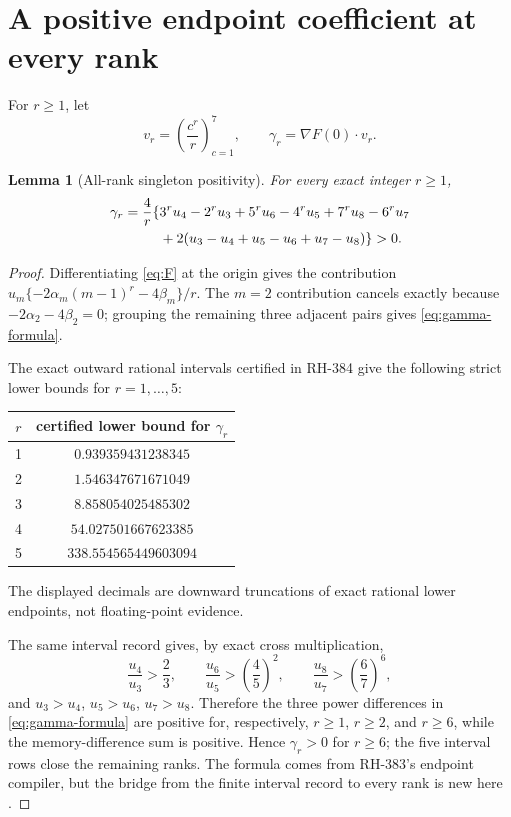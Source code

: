 \documentclass[11pt]{article}
\newtheorem{lemma}[theorem]{Lemma}
\theoremstyle{definition}
\theoremstyle{remark}
\begin{document}
\section{A positive endpoint coefficient at every rank}

For $r\ge1$, let
\begin{equation}
 v_r=\left(\frac{c^r}{r}\right)_{c=1}^7,
 \qquad \gamma_r=\nabla F(0)\mathbin{\cdot}v_r.
 \label{eq:vr-gamma}
\end{equation}

\begin{lemma}[All-rank singleton positivity]
\label{lem:gamma}
For every exact integer $r\ge1$,
\begin{align}
 \gamma_r=\frac4r\{&3^ru_4-2^ru_3+5^ru_6-4^ru_5
 +7^ru_8-6^ru_7\notag\\
 &+2(u_3-u_4+u_5-u_6+u_7-u_8)\}>0.
 \label{eq:gamma-formula}
\end{align}
\end{lemma}

\begin{proof}
Differentiating \eqref{eq:F} at the origin gives the contribution
$u_m\{-2\alpha_m(m-1)^r-4\beta_m\}/r$.  The $m=2$ contribution
cancels exactly because $-2\alpha_2-4\beta_2=0$; grouping the remaining
three adjacent pairs gives \eqref{eq:gamma-formula}.

The exact outward rational intervals certified in RH-384 give the
following strict lower bounds for $r=1,\ldots,5$:
\begin{center}
\begin{tabular}{@{}c@{\qquad}c@{}}
\toprule
$r$ & certified lower bound for $\gamma_r$\\
\midrule
1 & $0.939359431238345$\\
2 & $1.546347671671049$\\
3 & $8.858054025485302$\\
4 & $54.027501667623385$\\
5 & $338.554565449603094$\\
\bottomrule
\end{tabular}
\end{center}
The displayed decimals are downward truncations of exact rational lower
endpoints, not floating-point evidence.

The same interval record gives, by exact cross multiplication,
\begin{equation}
 \frac{u_4}{u_3}>\frac23,\qquad
 \frac{u_6}{u_5}>\left(\frac45\right)^2,\qquad
 \frac{u_8}{u_7}>\left(\frac67\right)^6,
 \label{eq:ratio-bridges}
\end{equation}
and $u_3>u_4$, $u_5>u_6$, $u_7>u_8$.  Therefore the three power
differences in \eqref{eq:gamma-formula} are positive for, respectively,
$r\ge1$, $r\ge2$, and $r\ge6$, while the memory-difference sum is
positive.  Hence $\gamma_r>0$ for $r\ge6$; the five interval rows close
the remaining ranks.  The formula comes from RH-383's endpoint compiler,
but the bridge from the finite interval record to every rank is new here
\cite{RH383,RH384}.
\end{proof}
\end{document}
